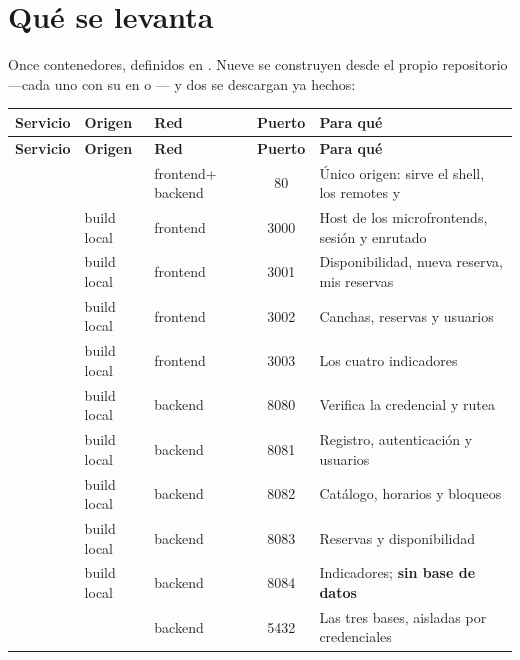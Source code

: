 
\section{Qué se levanta}

Once contenedores, definidos en . Nueve se construyen
desde el propio repositorio —cada uno con su  en
 o — y dos se descargan ya hechos:

\begin{center}
\small
\begin{xltabular}{\textwidth}{@{}l L{2.3cm} L{2.0cm} c Y@{}}
\toprule
\textbf{Servicio} & \textbf{Origen} & \textbf{Red} & \textbf{Puerto} &
\textbf{Para qué} \\
\midrule
\endfirsthead
\toprule
\textbf{Servicio} & \textbf{Origen} & \textbf{Red} & \textbf{Puerto} &
\textbf{Para qué} \\
\midrule
\endhead
{} & \newline{} & frontend\newline + backend & 80 &
  Único origen: sirve el shell, los remotes y  \\
 & build local & frontend & 3000 &
  Host de los microfrontends, sesión y enrutado \\
 & build local & frontend & 3001 &
  Disponibilidad, nueva reserva, mis reservas \\
 & build local & frontend & 3002 &
  Canchas, reservas y usuarios \\
 & build local & frontend & 3003 &
  Los cuatro indicadores \\
 & build local & backend & 8080 &
  Verifica la credencial y rutea \\
 & build local & backend & 8081 &
  Registro, autenticación y usuarios \\
 & build local & backend & 8082 &
  Catálogo, horarios y bloqueos \\
 & build local & backend & 8083 &
  Reservas y disponibilidad \\
 & build local & backend & 8084 &
  Indicadores; \textbf{sin base de datos} \\
 & \newline{} & backend & 5432 &
  Las tres bases, aisladas por credenciales \\
\bottomrule
\end{xltabular}
\end{center}

